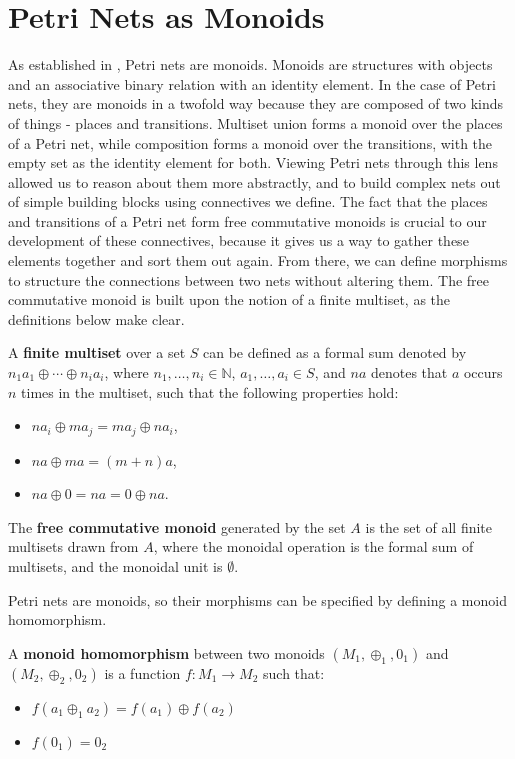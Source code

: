 \section{Petri Nets as Monoids}
As established in \cite{MESEGUER1990105}, Petri nets are monoids. Monoids are structures with objects and an associative binary relation with an identity element. In the case of Petri nets, they are monoids in a twofold way because they are composed of two kinds of things - places and transitions. Multiset union forms a monoid over the places of a Petri net, while composition forms a monoid over the transitions, with the empty set as the identity element for both. Viewing Petri nets through this lens allowed us to reason about them more abstractly, and to build complex nets out of simple building blocks using connectives we define. 
The fact that the places and transitions of a Petri net form free commutative monoids is crucial to our development of these connectives, because it gives us a way to gather these elements together and sort them out again. From there, we can define morphisms to structure the connections between two nets without altering them. The free commutative monoid is built upon the notion of a finite multiset, as the definitions below make clear. 
\begin{definition}
  \label{def:Finite-Multiset}
  A \textbf{finite multiset} over a set $S$ can be defined as a formal
  sum denoted by $n_1a_1 \oplus \cdots \oplus n_ia_i$, where $n_1,
  \ldots, n_i \in \mathbb{N}$, $a_1, \ldots, a_i \in S$, and $na$
  denotes that $a$ occurs $n$ times in the multiset, such that the
  following properties hold:
  \begin{itemize}    
  \item $na_i \oplus ma_j = ma_j \oplus na_i$,
  \item $na \oplus ma = (m+n)a$,
  \item $na \oplus 0 = na = 0 \oplus na$.
  \end{itemize}
\end{definition}
%
\begin{definition}
  \label{def:Free-Commutative-Monoid}  
  The \textbf{free commutative monoid} generated by the set $A$ is the
  set of all finite multisets drawn from $A$, where the monoidal
  operation is the formal sum of multisets, and the monoidal unit is
  $\emptyset$.
\end{definition}
Petri nets are monoids, so their morphisms can be specified by defining a monoid homomorphism.
\begin{definition}
  \label{Monoid-Homomorphism}
  A \textbf{monoid homomorphism} between two monoids $(M_1, \oplus_1, 0_1)$ and $(M_2, \oplus_2, 0_2)$
  is a function $f: M_1 \to M_2$ such that:
  \begin{itemize}
  \item $f(a_1 \oplus_1 a_2) = f(a_1) \oplus f(a_2)$
  \item $f (0_1) = 0_2$
  \end{itemize}
\end{definition}
%
